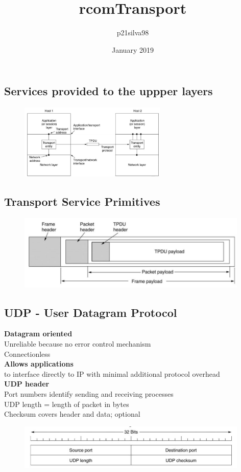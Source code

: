 \documentclass[../resumosRCOM.tex]{subfiles}
\title{rcomTransport}
\author{p21silva98 }
\date{January 2019}
\begin{document}
\subsection{Services provided to the uppper layers}

\begin{figure}[h]
    \centering
    \includegraphics[width=7cm]{images/trans1.JPG}
\end{figure}

\subsection{Transport Service Primitives}
\begin{figure}[h]
    \centering
    \includegraphics[width=11cm]{images/trans2.JPG}
\end{figure}

\subsection{UDP - User Datagram Protocol}
\textbf{Datagram oriented} \\
Unreliable because no error control mechanism\\ 
Connectionless\\
\textbf{Allows applications} \\
to interface directly to IP with minimal additional protocol overhead\\
\textbf{UDP header} \\
Port numbers identify sending and receiving processes \\
UDP length = length of packet in bytes \\
Checksum covers header and data; optional \\
\begin{figure}
    \centering
    \includegraphics[width=11cm]{images/trans3.JPG}
\end{figure}
\end{document}

